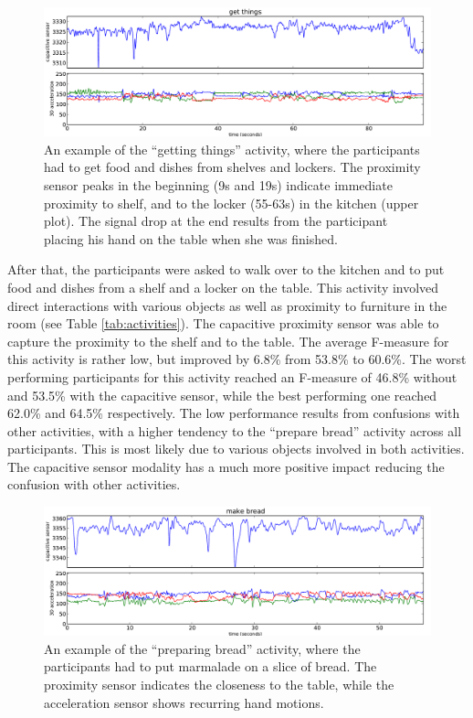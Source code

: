 \documentclass[runningheads,a4paper]{llncs}
\begin{document}
\begin{figure}[t]
	\centering
		\includegraphics[width=\textwidth]{../Auswertung/images/tobias_4.pdf}
	\caption{An example of the ``getting things'' activity, where the participants had to get food and dishes from shelves and lockers. The proximity sensor peaks in the beginning (9s and 19s) indicate immediate proximity to shelf, and to the locker (55-63s) in the kitchen (upper plot). The signal drop at the end results from the participant placing his hand on the table when she was finished.}
	\label{fig:get_things}
\end{figure}

After that, the participants were asked to walk over to the kitchen and to put food and dishes from a shelf and a locker on the table. This activity involved direct interactions with various objects as well as proximity to furniture in the room (see Table \ref{tab:activities}). The capacitive proximity sensor was able to capture the proximity to the shelf and to the table. The average F-measure for this activity is rather low, but improved by 6.8\% from 53.8\% to 60.6\%. 
The worst performing participants for this activity reached an F-measure of 46.8\% without and 53.5\% with the capacitive sensor, while the best performing one reached 62.0\% and 64.5\% respectively. The low performance results from confusions with other activities, with a higher tendency to the ``prepare bread'' activity across all participants. This is most likely due to various objects involved in both activities. The capacitive sensor modality has a much more positive impact reducing the confusion with other activities.

\begin{figure}[t]
	\centering
		\includegraphics[width=\textwidth]{../Auswertung/images/eugen_5.pdf}
	\caption{An example of the ``preparing bread'' activity, where the participants had to put marmalade on a slice of bread. The proximity sensor indicates the closeness to the table, while the acceleration sensor shows recurring hand motions.}
	\label{fig:prep_bread}
\end{figure}
\end{document}
